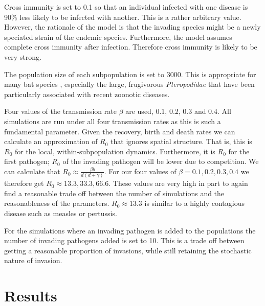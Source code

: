Cross immunity is set to 0.1 so that an individual infected with one disease is 90\% less likely to be infected with another.
This is a rather arbitrary value.
However, the rationale of the model is that the invading species might be a newly speciated strain of the endemic species.
Furthermore, the model assumes complete cross immunity after infection.
Therefore cross immunity is likely to be very strong.

The population size of each subpopulation is set to 3000. 
This is appropriate for many bat species \cite{jones2009pantheria}, especially the large, frugivorous \emph{Pteropodidae} that have been particularly associated with recent zoonotic diseases.


Four values of the transmission rate $\beta$ are used, 0.1, 0.2, 0.3 and 0.4.
All simulations are run under all four transmission rates as this is such a fundamental parameter.
Given the recovery, birth and death rates we can calculate an approximation of $R_0$ that ignores spatial structure.
That is, this is $R_0$ for the local, within-subpopulation dynamics.
Furthermore, it is $R_0$ for the first pathogen; $R_0$ of the invading pathogen will be lower due to competition.
We can calculate that $R_0 \approx \frac{\beta b}{d(d+ \gamma)}$.
For our four values of $\beta = 0.1, 0.2, 0.3, 0.4$ we therefore get $R_0 \approx 13.3, 33.3, 66.6$.
These values are very high in part to again find a reasonable trade off between the number of simulations and the reasonableness of the parameters.
$R_0 \approx 13.3$ is similar to a highly contagious disease such as measles or pertussis. 


For the simulations where an invading pathogen is added to the populations the number of invading pathogens added is set to 10. 
This is a trade off between getting a reasonable proportion of invasions, while still retaining the stochastic nature of invasion.












\clearpage
\section{Results}

